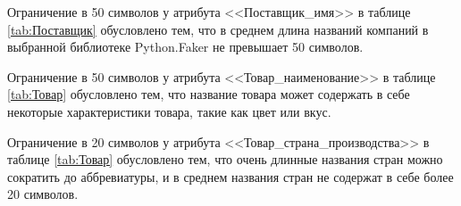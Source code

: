 \documentclass[a4paper]{article}
\begin{document}
\begin{table}[H]
  \caption{Приемы и ветеринары - veterinarian and appointment}
  \label{tab:vandapp}
\end{table}

Ограничение в 50 символов у атрибута <<Поставщик\_имя>> в таблице \ref{tab:Поставщик} обусловлено тем, что в среднем длина названий компаний в выбранной библиотеке Python.Faker не превышает 50 символов. 

\begin{table}[H]
  \caption{Поставщик - supplier}
  \label{tab:Поставщик}
\end{table}

Ограничение в 50 символов у атрибута <<Товар\_наименование>> в таблице \ref{tab:Товар} обусловлено тем, что название товара может содержать в себе некоторые характеристики товара, такие как цвет или вкус. 

Ограничение в 20 символов у атрибута <<Товар\_страна\_производства>> в таблице \ref{tab:Товар} обусловлено тем, что очень длинные названия стран можно сократить до аббревиатуры, и в среднем названия стран не содержат в себе более 20 символов. 
\end{document}
